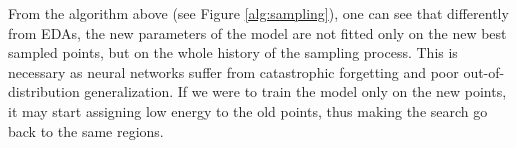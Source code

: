 From the algorithm above (see Figure \ref{alg:sampling}), one can see that differently from EDAs, the new parameters of the model are not fitted only on the new best sampled points, but on the whole history of the sampling process. This is necessary as neural networks suffer from catastrophic forgetting and poor out-of-distribution generalization. If we were to train the model only on the new points, it may start assigning low energy to the old points, thus making the search go back to the same regions.

